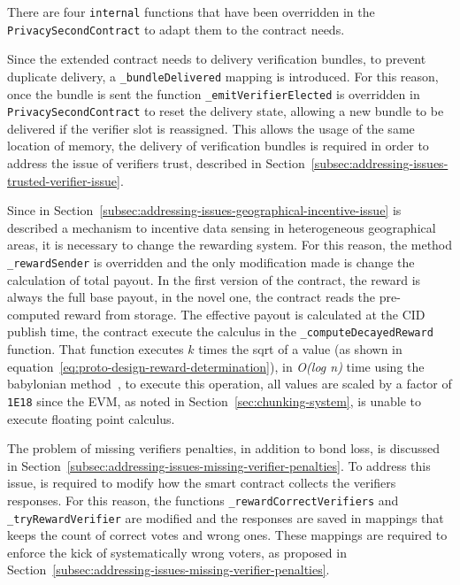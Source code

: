 There are four \texttt{internal} functions that have been overridden in the \texttt{PrivacySecondContract} to adapt them to the contract needs.

Since the extended contract needs to delivery verification bundles, to prevent duplicate delivery, a \texttt{\_bundleDelivered} mapping is introduced.
For this reason, once the bundle is sent the function \texttt{\_emitVerifierElected} is overridden in \texttt{PrivacySecondContract} to reset the delivery state, allowing a new bundle to be delivered if the verifier slot is reassigned.
This allows the usage of the same location of memory, the delivery of verification bundles is required in order to address the issue of verifiers trust, described in Section~\ref{subsec:addressing-issues-trusted-verifier-issue}.

Since in Section~\ref{subsec:addressing-issues-geographical-incentive-issue} is described a mechanism to incentive data sensing in heterogeneous geographical areas, it is necessary to change the rewarding system.
For this reason, the method \texttt{\_rewardSender} is overridden and the only modification made is change the calculation of total payout.
In the first version of the contract, the reward is always the full base payout, in the novel one, the contract reads the pre-computed reward from storage.
The effective payout is calculated at the CID publish time, the contract execute the calculus in the \texttt{\_computeDecayedReward} function.
That function executes $k$ times the sqrt of a value (as shown in equation~\ref{eq:proto-design-reward-determination}), in \textit{O(log n)} time using the babylonian method~\cite{kosheleva2009babylonian}, to execute this operation, all values are scaled by a factor of \texttt{1E18} since the EVM, as noted in Section~\ref{sec:chunking-system}, is unable to execute floating point calculus.

The problem of missing verifiers penalties, in addition to bond loss, is discussed in Section~\ref{subsec:addressing-issues-missing-verifier-penalties}.
To address this issue, is required to modify how the smart contract collects the verifiers responses.
For this reason, the functions \texttt{\_rewardCorrectVerifiers} and \texttt{\_tryRewardVerifier} are modified and the responses are saved in mappings that keeps the count of correct votes and wrong ones.
These mappings are required to enforce the kick of systematically wrong voters, as proposed in Section~\ref{subsec:addressing-issues-missing-verifier-penalties}.

